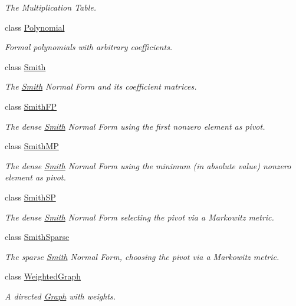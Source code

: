 \begin{DoxyCompactItemize}
\begin{DoxyCompactList}\small\item\em The Multiplication Table. \end{DoxyCompactList}\item 
class \hyperlink{classMackey_1_1Polynomial}{Polynomial}
\begin{DoxyCompactList}\small\item\em Formal polynomials with arbitrary coefficients. \end{DoxyCompactList}\item 
class \hyperlink{classMackey_1_1Smith}{Smith}
\begin{DoxyCompactList}\small\item\em The \hyperlink{classMackey_1_1Smith}{Smith} Normal Form and its coefficient matrices. \end{DoxyCompactList}\item 
class \hyperlink{classMackey_1_1SmithFP}{Smith\+FP}
\begin{DoxyCompactList}\small\item\em The dense \hyperlink{classMackey_1_1Smith}{Smith} Normal Form using the first nonzero element as pivot. \end{DoxyCompactList}\item 
class \hyperlink{classMackey_1_1SmithMP}{Smith\+MP}
\begin{DoxyCompactList}\small\item\em The dense \hyperlink{classMackey_1_1Smith}{Smith} Normal Form using the minimum (in absolute value) nonzero element as pivot. \end{DoxyCompactList}\item 
class \hyperlink{classMackey_1_1SmithSP}{Smith\+SP}
\begin{DoxyCompactList}\small\item\em The dense \hyperlink{classMackey_1_1Smith}{Smith} Normal Form selecting the pivot via a Markowitz metric. \end{DoxyCompactList}\item 
class \hyperlink{classMackey_1_1SmithSparse}{Smith\+Sparse}
\begin{DoxyCompactList}\small\item\em The sparse \hyperlink{classMackey_1_1Smith}{Smith} Normal Form, choosing the pivot via a Markowitz metric. \end{DoxyCompactList}\item 
class \hyperlink{classMackey_1_1WeightedGraph}{Weighted\+Graph}
\begin{DoxyCompactList}\small\item\em A directed \hyperlink{classMackey_1_1Graph}{Graph} with weights. \end{DoxyCompactList}\end{DoxyCompactItemize}
